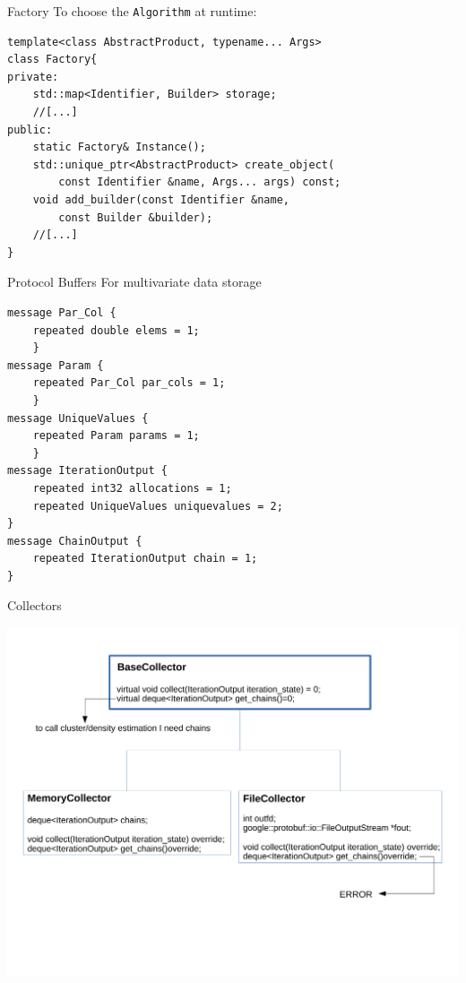 \begin{frame}[fragile]{Factory}
To choose the \verb|Algorithm| at runtime:
\begin{verbatim}
template<class AbstractProduct, typename... Args>
class Factory{
private:
    std::map<Identifier, Builder> storage;
    //[...]
public:
    static Factory& Instance();
    std::unique_ptr<AbstractProduct> create_object(
        const Identifier &name, Args... args) const;
    void add_builder(const Identifier &name,
        const Builder &builder);
    //[...]
}
\end{verbatim}
\end{frame}


\begin{frame}[fragile] {Protocol Buffers}
For multivariate data storage
\begin{small}
\begin{verbatim}
message Par_Col {
    repeated double elems = 1;
    }
message Param {
    repeated Par_Col par_cols = 1;
    }
message UniqueValues {
    repeated Param params = 1;
    }
message IterationOutput {
    repeated int32 allocations = 1;
    repeated UniqueValues uniquevalues = 2;
}
message ChainOutput {
    repeated IterationOutput chain = 1;
}
\end{verbatim}
\end{small}
\end{frame}


\begin{frame}{Collectors}
	\begin{center}
		\includegraphics[scale=0.35]{etc/collectors.pdf}
	\end{center}
\end{frame}
